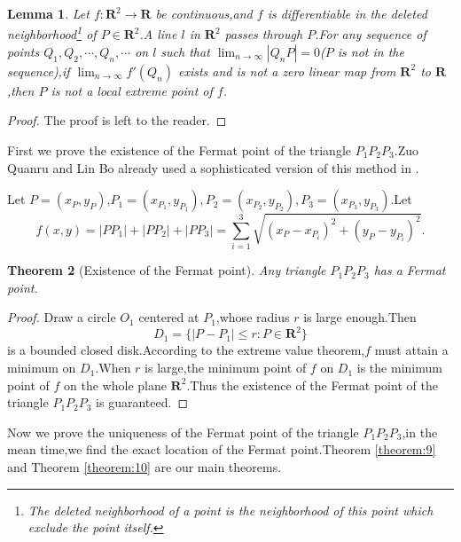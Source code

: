 \documentclass{amsart}
\theoremstyle{plain}
\newtheorem{theorem}{Theorem}
\newtheorem{lemma}[theorem]{Lemma}
\theoremstyle{definition}
\begin{document}
\begin{lemma}
  Let $f:\mathbf{R}^2\to \mathbf{R}$ be continuous,and $f$ is  differentiable
  in the deleted neighborhood\footnote{The deleted neighborhood of a
    point is the neighborhood of this point which exclude the point
    itself.} of $P\in \mathbf{R}^2$.A line $l$ in
  $\mathbf{R}^2$ passes through $P$.For any sequence of points $Q_1,Q_2,\cdots,Q_n,\cdots$ on
  $l$ such that $\lim_{n\to\infty}|Q_nP|=0$($P$ is not in the sequence),if
  $\lim_{n\to\infty} f'(Q_n)$ exists and is not a zero linear map from
  $\mathbf{R}^2$ to $\mathbf{R}$,then $P$ is not a local extreme point
  of $f$.
\end{lemma}
\begin{proof}
  The proof is left to the reader.
\end{proof}

First we prove the existence of the Fermat point of the triangle
$P_1P_2P_3$.Zuo Quanru and Lin Bo already used a
sophisticated version of this method in \cite{zuo}.

Let $P=(x_{P},y_{P})$,$P_1=(x_{P_{1}},y_{P_{1}}),P_2=(x_{P_{2}},y_{P_{2}}),P_3=(x_{P_{3}},y_{P_{3}})$.Let 
\begin{equation*}
  f(x,y)=|PP_1|+|PP_2|+|PP_3|=\sum_{i=1}^3\sqrt{(x_{P}-x_{P_{i}})^2+(y_{P}-y_{P_{i}})^2}.
\end{equation*}


\begin{theorem}[Existence of the Fermat point]\label{theorem:3}
  Any triangle $P_1P_2P_3$ has a Fermat point.
\end{theorem}
\begin{proof}
Draw a circle $O_1$ centered at $P_1$,whose radius $r$ is large
enough.Then $$D_{1}=\{|P-P_1|\leq r:P\in \mathbf{R}^2\}$$ is a bounded
closed disk.According to the extreme value theorem,$f$ must
attain a minimum on $D_1$.When $r$ is large,the minimum point of $f$ on
$D_1$ is the minimum point of $f$ on the whole plane $\mathbf{R}^2$.Thus the existence of the Fermat
point of the triangle $P_1P_2P_3$ is guaranteed.
\end{proof}





Now we prove the uniqueness of the Fermat point of the triangle
$P_1P_2P_3$,in the mean time,we find the exact
location of the Fermat point.Theorem \eqref{theorem:9}  and Theorem
\eqref{theorem:10} are our main theorems.
\end{document}

